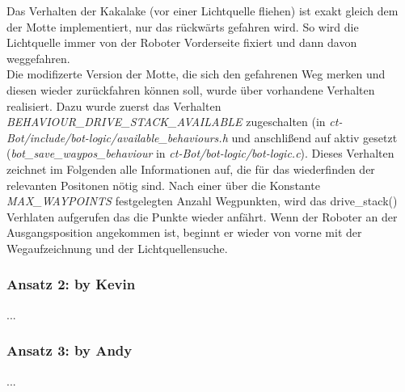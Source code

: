 Das Verhalten der Kakalake (vor einer Lichtquelle fliehen) ist exakt gleich dem der 
Motte implementiert, nur das rückwärts gefahren wird. So wird die Lichtquelle immer
von der Roboter Vorderseite fixiert und dann davon weggefahren. \\

Die modifizerte Version der Motte, die sich den gefahrenen Weg merken und diesen 
wieder zurückfahren können soll, wurde über vorhandene Verhalten realisiert.
Dazu wurde zuerst das Verhalten \textit{BEHAVIOUR\_DRIVE\_STACK\_AVAILABLE} zugeschalten
(in \textit{ct-Bot/include/bot-logic/available\_behaviours.h} und anschlißend
auf aktiv gesetzt (\textit{bot\_save\_waypos\_behaviour} in
\textit{ct-Bot/bot-logic/bot-logic.c}). Dieses Verhalten zeichnet im Folgenden
alle Informationen auf, die für das wiederfinden der relevanten Positonen nötig sind.
Nach einer über die Konstante \textit{MAX\_WAYPOINTS} festgelegten Anzahl Wegpunkten,
wird das drive\_stack() Verhlaten aufgerufen das die Punkte wieder anfährt.
Wenn der Roboter an der Ausgangsposition angekommen ist, beginnt er wieder von vorne mit
der Wegaufzeichnung und der Lichtquellensuche.


\subsubsection{Ansatz 2: by Kevin}
...

\subsubsection{Ansatz 3: by Andy}
...
